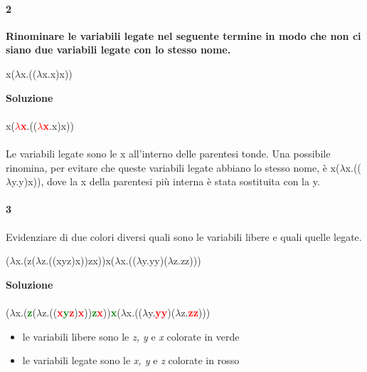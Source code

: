\paragraph{2}
\textbf{Rinominare le variabili legate nel seguente termine in modo che non ci siano due variabili legate con lo stesso nome.}
\begin{center}x($\lambda$x.(($\lambda$x.x)x))\end{center}
\textbf{Soluzione}\\\\
x(\textbf{\textcolor{red}{$\lambda$x}}.((\textbf{\textcolor{red}{$\lambda$x}}.x)x))\\\\
Le variabili legate sono le x all'interno delle parentesi tonde. Una possibile rinomina, per evitare che queste variabili legate abbiano lo stesso nome, \`e x($\lambda$x.(($\lambda$y.y)x)), dove la x della parentesi pi\`u interna \`e stata sostituita con la y.

\paragraph{3}
Evidenziare di due colori diversi quali sono le variabili libere e quali quelle legate.
\begin{center}($\lambda$x.(z($\lambda$z.((xyz)x))zx))x($\lambda$x.(($\lambda$y.yy)($\lambda$z.zz)))\end{center}
\textbf{Soluzione}\\\\
($\lambda$x.(\textbf{\textcolor{green}{z}}($\lambda$z.((\textbf{\textcolor{red}{x}\textcolor{green}{y}\textcolor{red}{z}})\textbf{\textcolor{red}{x}}))\textbf{\textcolor{green}{z}\textcolor{red}{x}}))\textbf{\textcolor{green}{x}}($\lambda$x.(($\lambda$y.\textbf{\textcolor{red}{yy}})($\lambda$z.\textbf{\textcolor{red}{zz}})))
\begin{itemize}
\item le variabili libere sono le \textit{z, y} e \textit{x} colorate in verde
\item le variabili legate sono le \textit{x, y} e \textit{z} colorate in rosso
\end{itemize}

